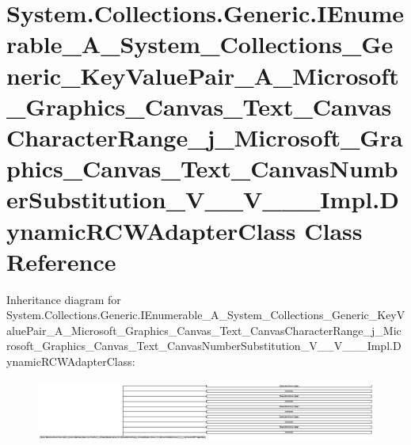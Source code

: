 \hypertarget{class_system_1_1_collections_1_1_generic_1_1_i_enumerable___a___system___collections___generic__42fe52de686fda2326acc28518140423}{}\section{System.\+Collections.\+Generic.\+I\+Enumerable\+\_\+\+A\+\_\+\+System\+\_\+\+Collections\+\_\+\+Generic\+\_\+\+Key\+Value\+Pair\+\_\+\+A\+\_\+\+Microsoft\+\_\+\+Graphics\+\_\+\+Canvas\+\_\+\+Text\+\_\+\+Canvas\+Character\+Range\+\_\+j\+\_\+\+Microsoft\+\_\+\+Graphics\+\_\+\+Canvas\+\_\+\+Text\+\_\+\+Canvas\+Number\+Substitution\+\_\+\+V\+\_\+\+\_\+\+V\+\_\+\+\_\+\+\_\+\+Impl.\+Dynamic\+R\+C\+W\+Adapter\+Class Class Reference}
\label{class_system_1_1_collections_1_1_generic_1_1_i_enumerable___a___system___collections___generic__42fe52de686fda2326acc28518140423}
Inheritance diagram for System.\+Collections.\+Generic.\+I\+Enumerable\+\_\+\+A\+\_\+\+System\+\_\+\+Collections\+\_\+\+Generic\+\_\+\+Key\+Value\+Pair\+\_\+\+A\+\_\+\+Microsoft\+\_\+\+Graphics\+\_\+\+Canvas\+\_\+\+Text\+\_\+\+Canvas\+Character\+Range\+\_\+j\+\_\+\+Microsoft\+\_\+\+Graphics\+\_\+\+Canvas\+\_\+\+Text\+\_\+\+Canvas\+Number\+Substitution\+\_\+\+V\+\_\+\+\_\+\+V\+\_\+\+\_\+\+\_\+\+Impl.\+Dynamic\+R\+C\+W\+Adapter\+Class\+:\begin{figure}[H]
\begin{center}
\leavevmode
\includegraphics[height=2.081081cm]{class_system_1_1_collections_1_1_generic_1_1_i_enumerable___a___system___collections___generic__42fe52de686fda2326acc28518140423}
\end{center}
\end{figure}

